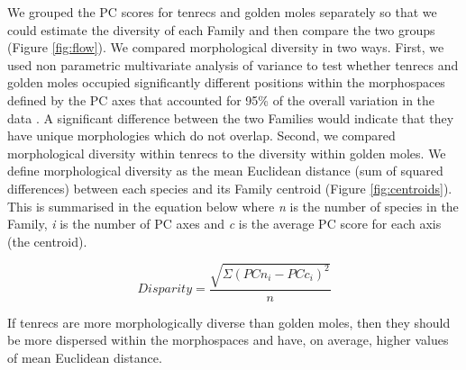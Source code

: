 \documentclass[12pt,a4paper]{article}
\begin{document}
	We grouped the PC scores for tenrecs and golden moles separately so that we could estimate the diversity of each Family and then compare the two groups (Figure \ref{fig:flow}). We compared morphological diversity in two ways. First, we used non parametric multivariate analysis of variance \citep[npMANOVA;][]{Anderson2001} to test whether tenrecs and golden moles occupied significantly different positions within the morphospaces defined by the PC axes that accounted for 95\% of the overall variation in the data \citep[e.g.][]{Serb2011, Ruta2013}. A significant difference between the two Families would indicate that they have unique morphologies which do not overlap. Second, we compared morphological diversity within tenrecs to the diversity within golden moles. We define morphological diversity as the mean Euclidean distance (sum of squared differences) between each species and its Family centroid (Figure \ref{fig:centroids}). This is summarised in the equation below where \textit{n} is the number of species in the Family, \textit{i} is the number of PC axes and \textit{c} is the average PC score for each axis (the centroid). 
	
	\begin{equation}
		Disparity = \frac{\sqrt{\Sigma(PCn_{i}-PCc_{i})^2}}{n}
	\end{equation}

	If tenrecs are more morphologically diverse than golden moles, then they should be more dispersed within the morphospaces and have, on average, higher values of mean Euclidean distance. 	
\end{document}
